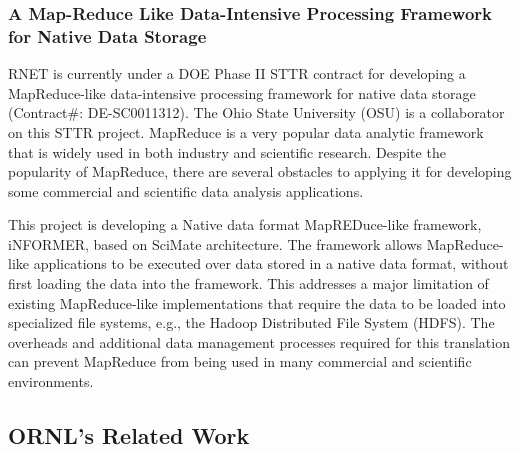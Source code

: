 \subsubsection{A Map-Reduce Like Data-Intensive Processing Framework for Native Data Storage}


RNET is currently under a DOE Phase II STTR contract for developing a MapReduce-like data-intensive processing framework 
for native data storage (Contract\#: DE-SC0011312). The Ohio State University (OSU) is a collaborator on this STTR project. 
MapReduce is a very popular data analytic framework that is widely used in both industry and scientific research. Despite 
the popularity of MapReduce, there are several obstacles to applying it for developing some commercial and scientific data 
analysis applications.


This project is developing a Native data format MapREDuce-like framework, iNFORMER, based on SciMate architecture. The 
framework allows MapReduce-like applications to be executed over data stored in a native data format, without first loading 
the data into the framework. This addresses a major limitation of existing MapReduce-like implementations that require the 
data to be loaded into specialized file systems, e.g., the Hadoop Distributed File System (HDFS). The overheads and additional
data management processes required for this translation can prevent MapReduce from being used in many commercial and 
scientific environments.





\subsection{ORNL's Related Work}
\label{sec:nice}


